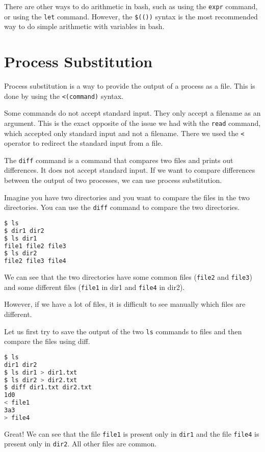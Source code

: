 There are other ways to do arithmetic in bash, such as using the
\lstinline|expr| command, or using the \lstinline|let| command. However,
the \lstinline|$(())| syntax is the most recommended way to do simple
arithmetic with variables in bash.

\section{Process Substitution}

Process substitution is a way to provide the output of a process
as a file. This is done by using the \lstinline|<(command)| syntax.

Some commands do not accept standard input. They only accept
a filename as an argument. This is the exact opposite of the
issue we had with the \lstinline|read| command, which accepted
only standard input and not a filename. There we used the
\lstinline|<| operator to redirect the standard input from a file.

The \lstinline|diff| command is a command that compares two files
and prints out differences. It does not accept standard input.
If we want to compare differences between the output of two
processes, we can use process substitution.

Imagine you have two directories and you want to compare the
files in the two directories. You can use the \lstinline|diff|
command to compare the two directories.

\begin{lstlisting}[language=bash]
$ ls
$ dir1 dir2
$ ls dir1
file1 file2 file3
$ ls dir2
file2 file3 file4
\end{lstlisting}

We can see that the two directories have some common files
(\lstinline|file2| and \lstinline|file3|) and some different files
(\lstinline|file1| in dir1 and \lstinline|file4| in dir2).

However, if we have a lot of files, it is difficult to see
manually which files are different.

Let us first try to save the output of the two \lstinline|ls|
commands to files and then compare the files using diff.

\begin{lstlisting}[language=bash]
$ ls
dir1 dir2
$ ls dir1 > dir1.txt
$ ls dir2 > dir2.txt
$ diff dir1.txt dir2.txt
1d0
< file1
3a3
> file4
\end{lstlisting}

Great! We can see that the file \lstinline|file1| is present only
in \lstinline|dir1| and the file \lstinline|file4| is present only
in \lstinline|dir2|. All other files are common.

